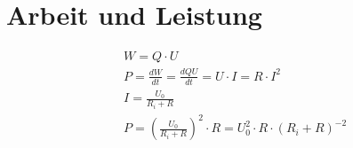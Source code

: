 \section{Arbeit und Leistung}

\begin{align*}
	& W = Q \cdot U \\
	& P = \frac{dW}{dt} = \frac{dQU}{dt} = U \cdot I = R \cdot I^2 \\
	& I = \frac{U_0}{R_i + R} \\
	& P = \left(\frac{U_0}{R_i + R}\right)^2 \cdot R = U_0^2 \cdot R \cdot (R_i + R)^{-2}
\end{align*}
